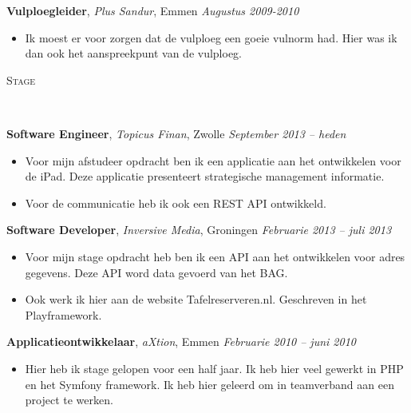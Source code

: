 \documentclass[9pt]{article}
\newenvironment{changemargin}[2]{%
  \begin{list}{}{%
    \setlength{\topsep}{0pt}%
    \setlength{\leftmargin}{#1}%
    \setlength{\rightmargin}{#2}%
    \setlength{\listparindent}{\parindent}%
    \setlength{\itemindent}{\parindent}%
    \setlength{\parsep}{\parskip}%
  }%
  \item[]}{\end{list}
}
\newcommand{\lineover}{
	\begin{changemargin}{-0.05in}{-0.05in}
		\vspace*{-8pt}
		\hrulefill \\
		\vspace*{-2pt}
	\end{changemargin}
}
\newcommand{\header}[1]{
	\begin{changemargin}{-0.5in}{-0.5in}
		\scshape{\niceHeadSmall#1}\\
  	\lineover
	\end{changemargin}
}
\newenvironment{body} {
	\vspace*{-16pt}
	\begin{changemargin}{-0.25in}{-0.5in}
  }	
	{\end{changemargin}
}
\begin{document}
\begin{body}
	\textbf {Vulploegleider}, \emph{Plus Sandur}, Emmen  \hfill \emph{Augustus 2009-2010}\\
	\vspace*{-4pt}
	\begin{itemize} \itemsep -0pt
		\item Ik moest er voor zorgen dat de vulploeg een goeie vulnorm had. Hier was ik dan ook het aanspreekpunt van de vulploeg.
	\end{itemize}
\end{body}

\smallskip

\newpage

\header{Stage}

\begin{body}
	\vspace{14pt}

	\textbf{Software Engineer}, \emph{Topicus Finan}, Zwolle \hfill \emph{September 2013 -- heden}\\
	\vspace*{-4pt}
	\begin{itemize} \itemsep -0pt  %
		\item Voor mijn afstudeer opdracht ben ik een applicatie aan het ontwikkelen voor de iPad. Deze applicatie presenteert strategische management informatie.
		\item Voor de communicatie heb ik ook een REST API ontwikkeld.
	\end{itemize}

	\textbf{Software Developer}, \emph{Inversive Media}, Groningen \hfill \emph{Februarie 2013 -- juli 2013}\\
	\vspace*{-4pt}
	\begin{itemize} \itemsep -0pt  %
		\item Voor mijn stage opdracht heb ben ik een API aan het ontwikkelen voor adres gegevens. Deze API word data gevoerd van het BAG.
		\item Ook werk ik hier aan de website Tafelreserveren.nl. Geschreven in het Playframework.
	\end{itemize}

	\textbf {Applicatieontwikkelaar}, \emph{aXtion}, Emmen \hfill \emph{Februarie 2010 -- juni 2010}\\
	\vspace*{-4pt}
	\begin{itemize} \itemsep -0pt
		\item Hier heb ik stage gelopen voor  een half jaar. Ik heb hier veel gewerkt in PHP en het Symfony framework. Ik heb hier geleerd om in teamverband aan een project te werken.
	\end{itemize}


\end{body}
\end{document}
